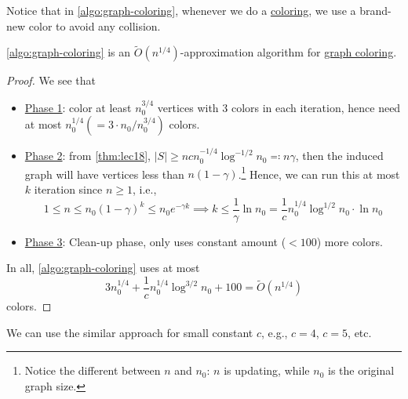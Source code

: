 Notice that in \autoref{algo:graph-coloring}, whenever we do a \hyperref[def:coloring]{coloring}, we use a brand-new color to avoid any collision.

\begin{theorem}
	\autoref{algo:graph-coloring} is an \(\widetilde{O} (n^{1 / 4})\)-approximation algorithm for \hyperref[prb:graph-coloring]{graph coloring}.
\end{theorem}
\begin{proof}
	We see that
	\begin{itemize}
		\item \hyperref[algo:graph-coloring-phase-1]{Phase 1}: color at least \(n_0^{3 / 4}\) vertices with \(3\) colors in each iteration, hence need at most \(n_0^{1 / 4} (= 3\cdot n_0 / n_0^{3 / 4})\) colors.
		\item \hyperref[algo:graph-coloring-phase-2]{Phase 2}: from \autoref{thm:lec18}, \(\left\vert S \right\vert \geq n c n_0^{-1 / 4} \log ^{-1 / 2} n_0 \eqqcolon n \gamma \), then the induced graph will have vertices less than \(n(1 - \gamma )\).\footnote{Notice the different between \(n\) and \(n_0\): \(n\) is updating, while \(n_0\) is the original graph size.} Hence, we can run this at most \(k\) iteration since \(n \geq 1\), i.e.,
		      \[
			      1 \leq n \leq n_0 (1 - \gamma )^k \leq n_0 e^{-\gamma k} \implies k \leq \frac{1}{\gamma} \ln n_0 = \frac{1}{c} n_0^{1 / 4}\log ^{1 / 2}n_0\cdot \ln n_0
		      \]
		\item \hyperref[algo:graph-coloring-phase-3]{Phase 3}: Clean-up phase, only uses constant amount (\(< 100\)) more colors.
	\end{itemize}
	In all, \autoref{algo:graph-coloring} uses at most
	\[
		3n_0^{1 / 4} + \frac{1}{c} n_0^{1 / 4} \log ^{3 / 2}n_0 + 100 = \widetilde{O} (n^{1 / 4})
	\]
	colors.
\end{proof}

\begin{remark}
	We can use the similar approach for small constant \(c\), e.g., \(c=4\), \(c=5\), etc.
\end{remark}